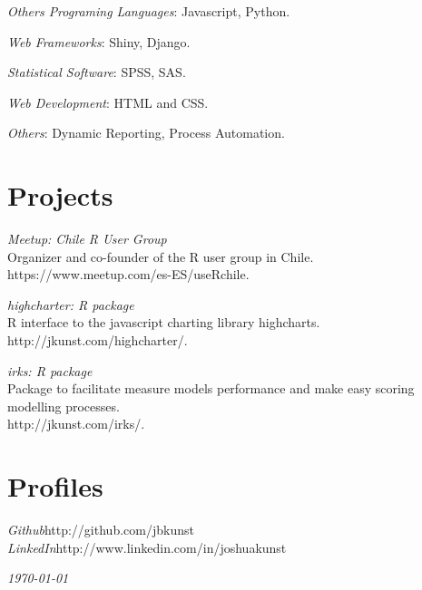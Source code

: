 \documentclass[margin]{res}
\begin{document}
\begin{resume}
    {\sl Others Programing Languages}: Javascript, Python.

    {\sl Web Frameworks}: Shiny, Django.

    {\sl Statistical Software}: SPSS, SAS.
    
    {\sl Web Development}: HTML and CSS.
    
    {\sl Others}: Dynamic Reporting, Process Automation.

\vspace{1cm}

\newpage

\section{Projects}

    {\sl Meetup: Chile R User Group}\\
    Organizer and co-founder of the R user group in Chile.\\
    https://www.meetup.com/es-ES/useRchile.

    {\sl highcharter: R package}\\
    R interface to the javascript charting library highcharts.\\
    http://jkunst.com/highcharter/.
    
    {\sl irks: R package}\\
    Package to facilitate measure models performance and make easy scoring modelling processes.\\
    http://jkunst.com/irks/.
    

\vspace{1cm}

\section{Profiles}
    
    {\sl Github}\hfill http://github.com/jbkunst\\
    
    {\sl LinkedIn}\hfill http://www.linkedin.com/in/joshuakunst

\vspace{1cm}


\end{resume}

\vspace{0.5cm}

\hfill {\sl \today}
\end{document}
